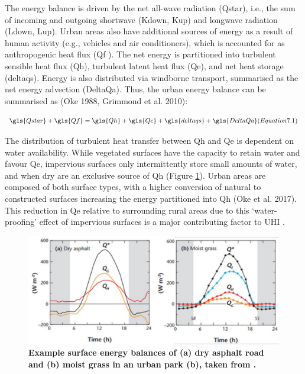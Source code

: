 \documentclass[final,3p,times,authoryear]{elsarticle}
\begin{document}
The energy balance is driven by the net all-wave radiation (\gls{Qstar}), i.e., the sum of
incoming and outgoing shortwave (\gls{Kdown}, \gls{Kup}) and longwave radiation (\gls{Ldown}, \gls{Lup}). Urban areas also have additional sources of energy as a result of human activity (e.g., vehicles and air conditioners), which is accounted for as anthropogenic heat flux (\gls{Qf} ). The net energy is partitioned into turbulent sensible heat flux (\gls{Qh}), turbulent latent heat flux (\gls{Qe}), and net heat storage (\gls{deltaqs}). Energy is also distributed via windborne transport, summarised as the net energy advection (\gls{DeltaQa}). Thus, the urban energy
balance can be summarised as (Oke 1988, Grimmond et al. 2010):

\begin{equation}
\gls{Qstar} + \gls{Qf} = \gls{Qh} + \gls{Qe} + \gls{deltaqs} + \gls{DeltaQa}
(Equation 7.1)
\label{eq:7.1} 
\end{equation}

The distribution of turbulent heat transfer between \gls{Qh} and \gls{Qe} is dependent on water availability. While vegetated surfaces have the capacity to retain water and favour \gls{Qe}, impervious surfaces only intermittently store small amounts of water, and when dry are an exclusive source of \gls{Qh} (Figure \ref{fig:7.1}). Urban areas are composed of both surface types, with a higher conversion of natural to constructed surfaces increasing the energy partitioned into \gls{Qh} (Oke et al. 2017). This reduction in \gls{Qe} relative to surrounding rural areas due to this `water-proofing' effect of impervious surfaces is a major contributing factor to UHI \citep{Oke19282}.

\begin{figure}
\centering
\includegraphics[trim={0 0 0 0},clip,scale=1.0]{SEB.png}
\caption{\bf Example surface energy balances of (a) dry asphalt road and (b) moist grass in an urban park (b), taken from \cite{Oke2017}.}
 \label{fig:7.1}
\end{figure}
\end{document}
